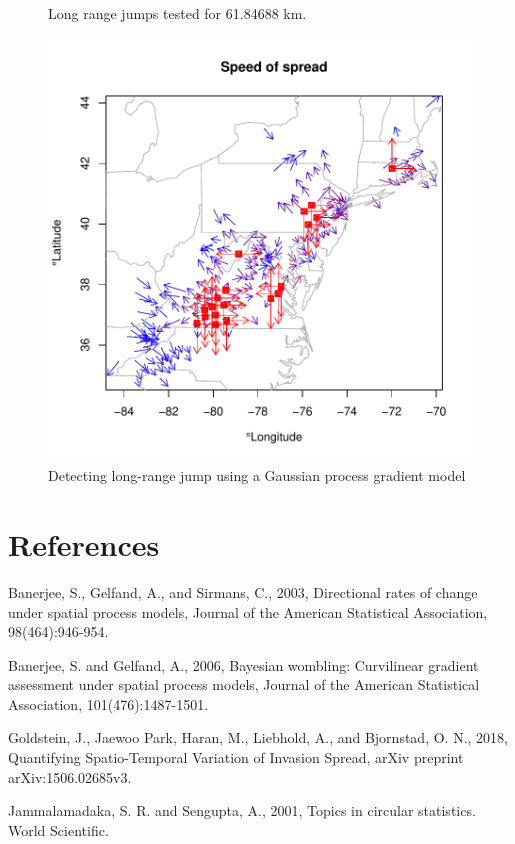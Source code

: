 \documentclass{article}
\begin{document}
\begin{figure}
\begin{center}
\begin{Schunk}
\begin{Soutput}
Long range jumps tested for  61.84688 km.
\end{Soutput}
\end{Schunk}
\includegraphics{invasionSpeed_doc-016}
\end{center}
\caption{Detecting long-range jump using a Gaussian process gradient model}
\label{GPjump2}
\end{figure}



\section*{References}
\begin{description}

\item Banerjee, S., Gelfand, A., and Sirmans, C., 2003, Directional rates of change under spatial process models, Journal of the American Statistical Association, 98(464):946-954.

\item Banerjee, S. and Gelfand, A., 2006, Bayesian wombling: Curvilinear gradient assessment under spatial process models, Journal of the American Statistical Association, 101(476):1487-1501.

\item Goldstein, J., Jaewoo Park, Haran, M., Liebhold, A., and Bjornstad, O. N., 2018, Quantifying Spatio-Temporal Variation of Invasion Spread, arXiv preprint arXiv:1506.02685v3.

\item Jammalamadaka, S. R. and Sengupta, A., 2001, Topics in circular statistics. World Scientific.

\end{description}
\end{document}
